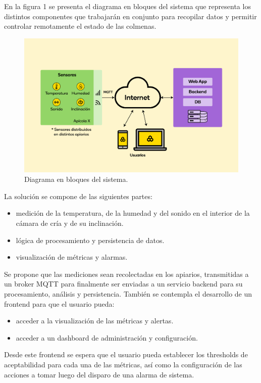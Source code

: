\documentclass[
11pt, %
codirector, %
]{charter}
\begin{document}
En la figura 1 se presenta el diagrama en bloques del sistema que representa los distintos componentes que trabajarán en conjunto para recopilar datos y permitir controlar remotamente el estado de las colmenas.

\begin{figure}[htpb]
\centering 
\includegraphics[width=1\textwidth]{./Figuras/diagBloquesPropio.jpg}
\caption{Diagrama en bloques del sistema.}
\label{fig:diagBloques}
\end{figure}



La solución se compone de las siguientes partes:
\begin{itemize}
\item medición de la temperatura, de la humedad y del sonido en el interior de la cámara de cría y de su inclinación.
\item lógica de procesamiento y persistencia de datos.
\item visualización de métricas y alarmas.
\end{itemize}

Se propone que las mediciones sean recolectadas en los apiarios, transmitidas a un broker MQTT para finalmente ser enviadas a un servicio backend para su procesamiento, análisis y persistencia.
También se contempla el desarrollo de un frontend para que el usuario pueda:
\begin{itemize}
\item acceder a la visualización de las métricas y alertas.
\item acceder a un dashboard de administración y configuración.
\end{itemize}
Desde este frontend se espera que el usuario pueda establecer los thresholds de aceptabilidad para cada una de las métricas, así como la configuración de las acciones a tomar luego del disparo de una alarma de sistema.
\end{document}
